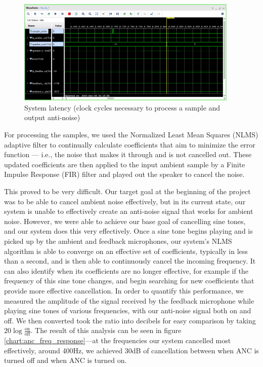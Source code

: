 \documentclass{fpgairpods}
\begin{document}
\begin{figure}[h]
\centering
\includegraphics[width=300pt]{./figs/system_latency_ila.png}
\caption{System latency (clock cycles necessary to process a sample and output anti-noise)}
\label{fig:systemlatency}
\end{figure}

For processing the samples, we used the Normalized Least Mean Squares (NLMS) adaptive filter to continually calculate coefficients that aim to minimize the error function --- i.e., the noise that makes it through and is not cancelled out. These updated coefficients are then applied to the input ambient sample by a Finite Impulse Response (FIR) filter and played out the speaker to cancel the noise. 

This proved to be very difficult. Our target goal at the beginning of the project was to be able to cancel ambient noise effectively, but in its current state, our system is unable to effectively create an anti-noise signal that works for ambient noise. However, we were able to achieve our base goal of cancelling sine tones, and our system does this very effectively. Once a sine tone begins playing and is picked up by the ambient and feedback microphones, our system's NLMS algorithm is able to converge on an effective set of coefficients, typically in less than a second, and is then able to continuously cancel the incoming frequency. It can also identify when its coefficients are no longer effective, for example if the frequency of this sine tone changes, and begin searching for new coefficients that provide more effective cancellation. In order to quantify this performance, we measured the amplitude of the signal received by the feedback microphone while playing sine tones of various frequencies, with our anti-noise signal both on and off. We then converted took the ratio into decibels for easy comparison by taking $20\log{\frac{\text{on}}{\text{off}}}$. The result of this analysis can be seen in figure \ref{chart:anc_freq_response}---at the frequencies our system cancelled most effectively, around 400Hz, we achieved 30dB of cancellation between when ANC is turned off and when ANC is turned on.
\end{document}
